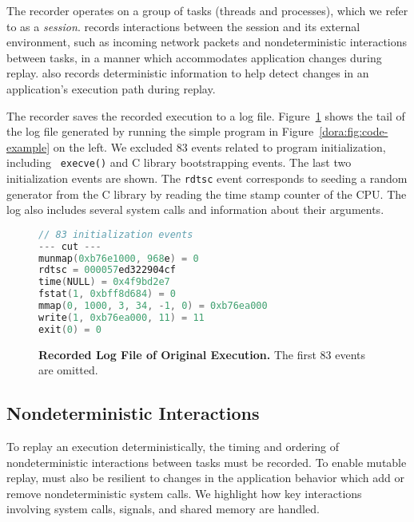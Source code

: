The recorder operates on a group of tasks (threads and processes), which we
refer to as a {\em session}. {\dora} records interactions between the
session and its external environment, such as incoming network packets and
nondeterministic interactions between tasks, in a manner which accommodates
application changes during replay. {\dora} also records deterministic
information to help detect changes in an application's execution path during
replay.

The recorder saves the recorded execution to a log file.
Figure~\ref{dora:fig:example-orig-log} shows the
tail of the log file generated by running the simple program in
Figure~\ref{dora:fig:code-example} on the left.
We excluded 83 events related to program initialization, including {\tt
execve()} and C library bootstrapping events. The last two initialization events
are shown. The {\tt rdtsc} event corresponds to seeding a random generator from the C library
by reading the time stamp counter of the CPU. The log also includes
several system calls and information about their arguments.

\begin{figure}
\centering
\begin{minipage}{.58\textwidth}
\small
\begin{rbox}
\begin{lstlisting}[framexleftmargin=5pt,language=C,basicstyle=\ttfamily]
// 83 initialization events
--- cut ---
munmap(0xb76e1000, 968e) = 0
rdtsc = 000057ed322904cf
time(NULL) = 0x4f9bd2e7
fstat(1, 0xbff8d684) = 0
mmap(0, 1000, 3, 34, -1, 0) = 0xb76ea000
write(1, 0xb76ea000, 11) = 11
exit(0) = 0
\end{lstlisting}
\end{rbox}
\end{minipage}
\caption{{\bf Recorded Log File of Original Execution.} The first 83 events are omitted. }
\label{dora:fig:example-orig-log}
\end{figure}

\subsection{Nondeterministic Interactions}
To replay an execution deterministically, the timing and ordering of
nondeterministic interactions between tasks must be recorded.  To
enable mutable replay, {\dora} must also be resilient to changes in
the application behavior which add or remove nondeterministic system calls. We
highlight how key interactions involving system calls, signals, and shared
memory are handled.

